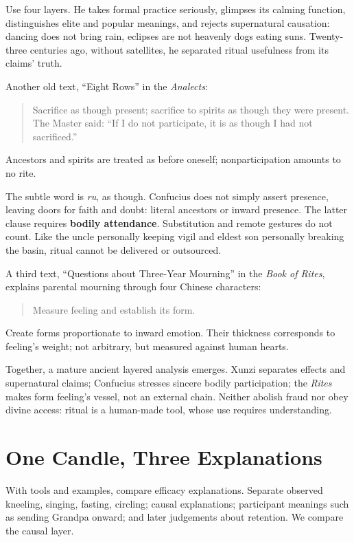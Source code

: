 Use four layers. He takes formal practice seriously, glimpses its calming function, distinguishes elite and popular meanings, and rejects supernatural causation: dancing does not bring rain, eclipses are not heavenly dogs eating suns. Twenty-three centuries ago, without satellites, he separated ritual usefulness from its claims' truth.

Another old text, ``Eight Rows'' in the \textit{Analects}:

\begin{quote}
Sacrifice as though present; sacrifice to spirits as though they were present. The Master said: ``If I do not participate, it is as though I had not sacrificed.''
\end{quote}
Ancestors and spirits are treated as before oneself; nonparticipation amounts to no rite.

The subtle word is \textit{ru}, as though. Confucius does not simply assert presence, leaving doors for faith and doubt: literal ancestors or inward presence. The latter clause requires \textbf{bodily attendance}. Substitution and remote gestures do not count. Like the uncle personally keeping vigil and eldest son personally breaking the basin, ritual cannot be delivered or outsourced.

A third text, ``Questions about Three-Year Mourning'' in the \textit{Book of Rites}, explains parental mourning through four Chinese characters:

\begin{quote}
Measure feeling and establish its form.
\end{quote}
Create forms proportionate to inward emotion. Their thickness corresponds to feeling's weight; not arbitrary, but measured against human hearts.

Together, a mature ancient layered analysis emerges. Xunzi separates effects and supernatural claims; Confucius stresses sincere bodily participation; the \textit{Rites} makes form feeling's vessel, not an external chain. Neither abolish fraud nor obey divine access: ritual is a human-made tool, whose use requires understanding.

\section{One Candle, Three Explanations}
With tools and examples, compare efficacy explanations. Separate observed kneeling, singing, fasting, circling; causal explanations; participant meanings such as sending Grandpa onward; and later judgements about retention. We compare the causal layer.

